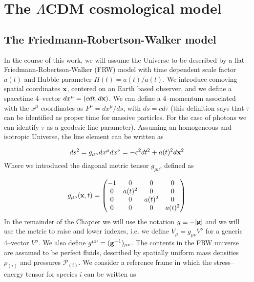 
\chapter{The $\Lambda$CDM cosmological model}
\lhead[\fancyplain{}{\thepage}]{\fancyplain{}{\rightmark}}
 \thispagestyle{plain}
\setlength{\parindent}{10mm}


\section{The Friedmann-Robertson-Walker model}
In the course of this work, we will assume the Universe to be described by a flat Friedmann-Robertson-Walker (FRW) model with time dependent scale factor $a(t)$ and Hubble parameter $H(t)=\dot{a}(t)/a(t)$. We introduce comoving spatial coordinates $\mathbf{x}$, centered on an Earth based observer, and we define a spacetime 4--vector $dx^{\mu}=(cdt,d\mathbf{x})$. We can define a 4--momentum associated with the $x^\mu$ coordinates as $P^\mu=dx^\mu/ds$, with $ds=cd\tau$ (this definition says that $\tau$ can be identified as proper time for massive particles. For the case of photons we can identify $\tau$ as a geodesic line parameter). Assuming an homogeneous and isotropic Universe, the line element can be written as  

\begin{equation}
\label{eq:1:frw}
ds^2 = g_{\mu\nu}dx^\mu dx^\nu = -c^2dt^2 + a(t)^2d\mathbf{x}^2
\end{equation}
%
Where we introduced the diagonal metric tensor $g_{\mu\nu}$, defined as 

\begin{equation}
\label{eq:1:metric}
g_{\mu\nu}(\mathbf{x},t) = 
\begin{pmatrix}
-1 & 0 & 0 & 0 \\
0 & a(t)^2 & 0 & 0 \\
0 & 0 & a(t)^2 & 0 \\
0 & 0 & 0 & a(t)^2 
\end{pmatrix}
\end{equation}
%
In the remainder of the Chapter we will use the notation $g\equiv-\vert\mathbf{g}\vert$ and we will use the metric to raise and lower indexes, i.e. we define $V_\mu = g_{\mu\nu}V^\nu$ for a generic 4--vector $V^\mu$. We also define $g^{\mu\nu}=(\mathbf{g}^{-1})_{\mu\nu}$.
The contents in the FRW universe are assumed to be perfect fluids, described by spatially uniform mass densities $\rho_{(i)}$ and pressures $\mathcal{P}_{(i)}$. We consider a reference frame in which the stress--energy tensor for species $i$ can be written as 

